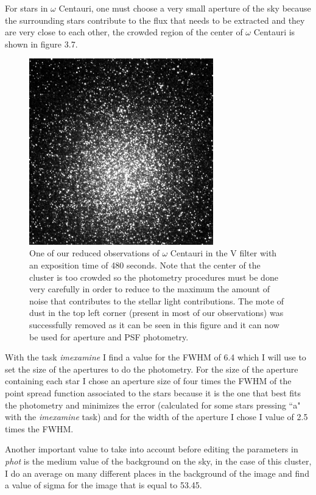 For stars in $\omega$ Centauri, one must choose a very small aperture of the sky because the surrounding stars contribute to the flux that needs to be extracted and they are very close to each other, the crowded region of the center of $\omega$ Centauri is shown in figure 3.7. 

\begin{figure}[H]
\centering
\includegraphics[width=8cm]{images/NGC5139_red.png}
\caption[NGC5139 as observed in the V filter]{One of our reduced observations of $\omega$ Centauri in the V filter with an exposition time of 480 seconds. Note that the center of the cluster is too crowded so the photometry procedures must be done very carefully in order to reduce to the maximum the amount of noise that contributes to the stellar light contributions. The mote of dust in the top left corner (present in most of our observations) was successfully removed as it can be seen in this figure and it can now be used for aperture and PSF photometry.}
\end{figure}

With the task \textit{imexamine} I find a value for the FWHM of 6.4 which I will use to set the size of the apertures to do the photometry. For the size of the aperture containing each star I chose an aperture size of four times the FWHM of the point spread function associated to the stars because it is the one that best fits the photometry and minimizes the error (calculated for some stars pressing ``a" with the \textit{imexamine} task) and for the width of the aperture I chose I value of 2.5 times the FWHM.

Another important value to take into account before editing the parameters in \textit{phot} is the medium value of the background on the sky, in the case of this cluster, I do an average on many different places in the background of the image and find a value of sigma for the image that is equal to 53.45.

